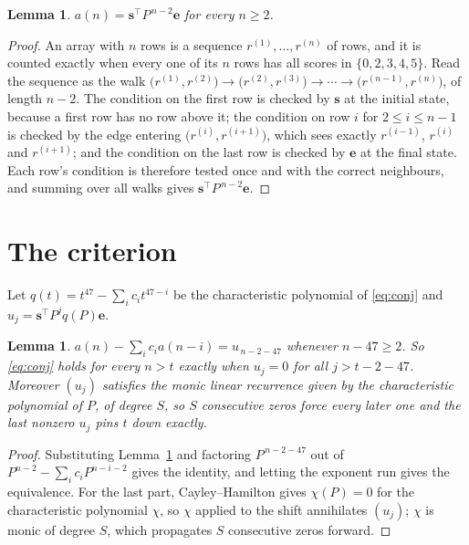 \documentclass[11pt,a4paper]{article}
\theoremstyle{plain}
\newtheorem{lemma}[theorem]{Lemma}
\theoremstyle{definition}
\begin{document}
\begin{lemma}\label{lem:walk}
$a(n)=\mathbf{s}^{\!\top}P^{\,n-2}\mathbf{e}$ for every $n\ge2$.
\end{lemma}

\begin{proof}
An array with $n$ rows is a sequence $r^{(1)},\dots,r^{(n)}$ of rows, and it is counted
exactly when every one of its $n$ rows has all scores in $\{0,2,3,4,5\}$. Read the sequence as the
walk $\bigl(r^{(1)},r^{(2)}\bigr)\to\bigl(r^{(2)},r^{(3)}\bigr)\to\cdots\to
\bigl(r^{(n-1)},r^{(n)}\bigr)$, of length $n-2$. The condition on the first row is
checked by $\mathbf{s}$ at the initial state, because a first row has no row above it; the
condition on row $i$ for $2\le i\le n-1$ is checked by the edge entering
$\bigl(r^{(i)},r^{(i+1)}\bigr)$, which sees exactly $r^{(i-1)}$, $r^{(i)}$ and
$r^{(i+1)}$; and the condition on the last row is checked by $\mathbf{e}$ at the final
state. Each row's condition is therefore tested once and with the correct neighbours, and
summing over all walks gives $\mathbf{s}^{\!\top}P^{\,n-2}\mathbf{e}$.
\end{proof}

\section{The criterion}

Let $q(t)=t^{47}-\sum_i c_i t^{47-i}$ be the characteristic polynomial of
\eqref{eq:conj} and $u_j=\mathbf{s}^{\!\top}P^{j}q(P)\mathbf{e}$.

\begin{lemma}\label{lem:crit}
$a(n)-\sum_i c_i a(n-i)=u_{\,n-2-47}$ whenever $n-47\ge2$. So \eqref{eq:conj}
holds for every $n>t$ exactly when $u_j=0$ for all $j>t-2-47$. Moreover $(u_j)$
satisfies the monic linear recurrence given by the characteristic polynomial of $P$, of
degree $S$, so $S$ consecutive zeros force every later one and the last nonzero $u_j$ pins
$t$ down exactly.
\end{lemma}

\begin{proof}
Substituting Lemma~\ref{lem:walk} and factoring $P^{\,n-2-47}$ out of
$P^{n-2}-\sum_i c_i P^{n-i-2}$ gives the identity, and letting the exponent run gives the
equivalence. For the last part, Cayley--Hamilton gives $\chi(P)=0$ for the characteristic
polynomial $\chi$, so $\chi$ applied to the shift annihilates $(u_j)$; $\chi$ is monic of
degree $S$, which propagates $S$ consecutive zeros forward.
\end{proof}
\end{document}
